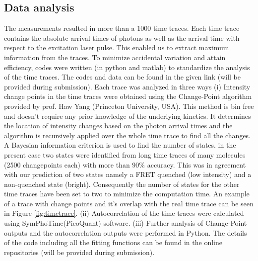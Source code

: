 \documentclass[journal=jacsat,manuscript=article]{achemso}
\begin{document}
\subsection{Data analysis}
The measurements resulted in more than a $1000$ time traces. Each time trace contains the absolute arrival times of 
photons as well as the arrival time with respect to the excitation laser pulse. This enabled us to extract maximum 
information from the traces. To minimize accidental variation and attain efficiency, codes were written 
(in python and matlab) to standardize the analysis of the time traces. The codes and data can be found in the given 
link (will be provided during submission). Each trace was analyzed in three ways (i) Intensity change points in the 
time traces were obtained using the Change-Point algorithm\cite{watkins2005detection} provided by prof. Haw Yang 
(Princeton University, USA). This method is bin free and doesn't require any prior knowledge of the underlying 
kinetics. It determines the location of intensity changes based on the photon arrival times and the algorithm is 
recursively applied over the whole time trace to find all the changes. A Bayesian information criterion is used to 
find the number of states. in the present case two states were identified from long time traces of many molecules 
(2500 changepoints each) with more than $90\%$ accuracy. This was in agreement with our prediction of two states 
namely a FRET quenched (low intensity) and a non-quenched state (bright). Consequently the number of states for the 
other time traces have been set to two to minimize the computation time. An example of a trace with change points 
and it's overlap with the real time trace can be seen in Figure-\ref{fig:timetrace}. (ii) Autocorrelation of the 
time traces were calculated using SymPhoTime(PicoQuant) software. (iii) Further analysis of Change-Point outputs and 
the autocorrelation outputs were performed in Python. The details of the code including all the fitting functions 
can be found in the online repositories (will be provided during submission).
\end{document}
